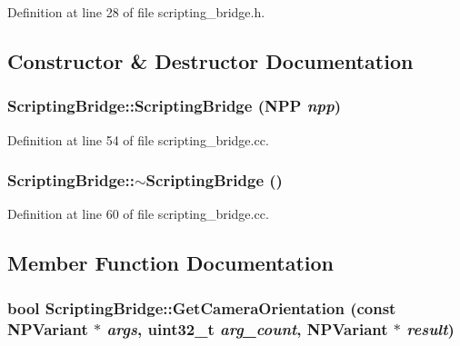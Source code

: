 Definition at line 28 of file scripting\_\-bridge.h.



\subsection{Constructor \& Destructor Documentation}
\hypertarget{classtumbler_1_1_scripting_bridge_ae743ff1b8ffce6889a86a73500fd0da1}{
\subsubsection[{ScriptingBridge}]{\setlength{\rightskip}{0pt plus 5cm}ScriptingBridge::ScriptingBridge (NPP {\em npp})}}
\label{classtumbler_1_1_scripting_bridge_ae743ff1b8ffce6889a86a73500fd0da1}


Definition at line 54 of file scripting\_\-bridge.cc.

\hypertarget{classtumbler_1_1_scripting_bridge_ae6c311b5f9ffa0a578c7d8e41fa9c23c}{
\subsubsection[{$\sim$ScriptingBridge}]{\setlength{\rightskip}{0pt plus 5cm}ScriptingBridge::$\sim$ScriptingBridge ()}}
\label{classtumbler_1_1_scripting_bridge_ae6c311b5f9ffa0a578c7d8e41fa9c23c}


Definition at line 60 of file scripting\_\-bridge.cc.



\subsection{Member Function Documentation}
\hypertarget{classtumbler_1_1_scripting_bridge_a95b4a3ee287861d23021bfae7b7c1b08}{
\subsubsection[{GetCameraOrientation}]{\setlength{\rightskip}{0pt plus 5cm}bool ScriptingBridge::GetCameraOrientation (const NPVariant $\ast$ {\em args}, \/  uint32\_\-t {\em arg\_\-count}, \/  NPVariant $\ast$ {\em result})}}
\label{classtumbler_1_1_scripting_bridge_a95b4a3ee287861d23021bfae7b7c1b08}


